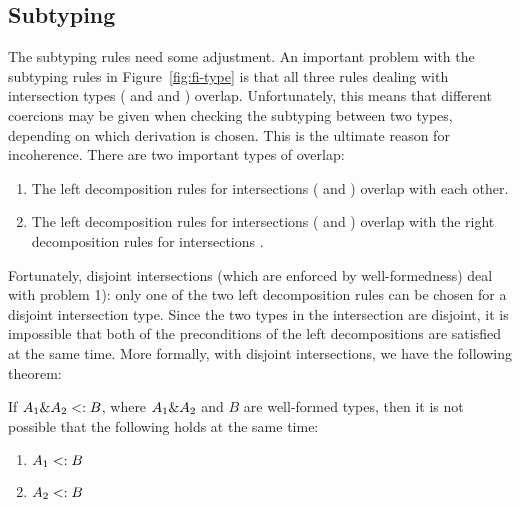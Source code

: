 \subsection{Subtyping}


The subtyping rules need some adjustment. An important problem with the
subtyping rules in Figure~\ref{fig:fi-type} is that all three rules dealing
with intersection types ( and
 and ) overlap.
Unfortunately, this means that different coercions may be given when checking
the subtyping between two types, depending on which derivation is chosen. This
is the ultimate reason for incoherence. There are two important types of
overlap:

\begin{enumerate}

\item The left decomposition rules for intersections (
and ) overlap with each other.

\item The left decomposition rules for intersections (
and ) overlap with the right decomposition rules for
intersections .

\end{enumerate}

\noindent Fortunately, disjoint intersections (which are enforced by
well-formedness) deal with problem 1): only one of the two left decomposition
rules can be chosen for a disjoint intersection type. Since the two types in the
intersection are disjoint, it is impossible that both of the preconditions of
the left decompositions are satisfied at the same time. More formally, with
disjoint intersections, we have the following theorem:

\begin{lemma}
  \label{lemma:unique-subtype-contributor}

  If $A_1 \& A_2 <: B$, where $A_1 \& A_2$ and $B$ are well-formed types,
  then it is not possible that the following holds at the same time:
  \begin{enumerate}
    \item $A_1 <: B$
    \item $A_2 <: B$
  \end{enumerate}
\end{lemma}

